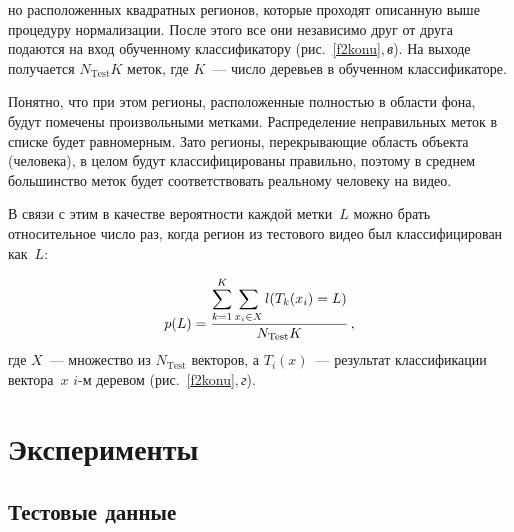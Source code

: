 \begin{multicols}{2}


\noindent
но расположенных квадратных регионов, которые проходят описанную выше процедуру 
нормализации. После этого все они независимо друг от друга подаются на вход обученному 
классификатору (рис.~\ref{f2konu},\,\textit{в}). На выходе получается $N_{\mathrm{Test}}K$ меток, где 
$K$~--- число деревьев в обученном классифи\-каторе.
{

}

Понятно, что при этом регионы, расположенные полностью в области фона, будут помечены 
произвольными метками. Распределение неправильных меток в списке будет равномерным. Зато 
регионы, перекрывающие область объекта (человека), в целом будут классифицированы 
правильно, поэтому в среднем большинство меток будет соответствовать реальному человеку 
на видео.


В связи с этим в качестве вероятности каждой метки~$L$ можно брать относительное число раз, когда 
регион из тестового видео был классифицирован как~$L$:

\noindent
$$
p(L) =\displaystyle\frac{\displaystyle \sum\limits_{k=1}^K \sum\limits_{x_i\in X} l(T_k(x_i)=L)\mathstrut}{\displaystyle N_{\mathrm{Test}}K\mathstrut}\,,
$$
где $X$~--- множество из $N_{\mathrm{Test}}$ векторов, а $T_i(x)$~--- результат классификации 
вектора~$x$ $i$-м деревом (рис.~\ref{f2konu},\,\textit{г}).

\section{Эксперименты}

\subsection{Тестовые данные}

\begin{figure*}[b] %
\vspace*{1pt}
\begin{center}
\mbox{%
\epsfxsize=161.135mm
}
\end{center}
\vspace*{-9pt}
\end{figure*}



\end{multicols}
